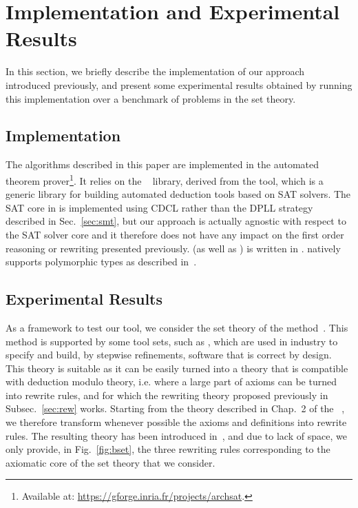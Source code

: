 
\section{Implementation and Experimental Results}
\label{sec:bench}

In this section, we briefly describe the implementation of our approach
introduced previously, and present some experimental results obtained by running
this implementation over a benchmark of problems in the \bmth{} set theory.

\subsection{Implementation}

The algorithms described in this paper are implemented in the \archsat{}
automated theorem prover\footnote{Available at:
\url{https://gforge.inria.fr/projects/archsat}.}. It relies on the
\msat{}~\cite{GB17} library, derived from the \altergoz{} tool, which is a
generic library for building automated deduction tools based on SAT solvers. The
SAT core in \msat{} is implemented using CDCL rather than the DPLL strategy
described in Sec.~\ref{sec:smt}, but our approach is actually agnostic with
respect to the SAT solver core and it therefore does not have any impact on the
first order reasoning or rewriting presented previously. \archsat{} (as well as
\msat{}) is written in \ocaml{}. \archsat{} natively supports polymorphic types
as described in~\cite{BP13}.

\subsection{Experimental Results}

As a framework to test our tool, we consider the set theory of the \bmth{}
method~\cite{B-Book}. This method is supported by some tool sets, such as
\atelierb{}, which are used in industry to specify and build, by stepwise
refinements, software that is correct by design. This theory is suitable as it
can be easily turned into a theory that is compatible with deduction modulo
theory, i.e. where a large part of axioms can be turned into rewrite rules, and
for which the rewriting theory proposed previously in Subsec.~\ref{sec:rew}
works. Starting from the theory described in Chap.~2 of the
\bbook{}~\cite{B-Book}, we therefore transform whenever possible the axioms and
definitions into rewrite rules. The resulting theory has been introduced
in~\cite{BA15}, and due to lack of space, we only provide, in
Fig.~\ref{fig:bset}, the three rewriting rules corresponding to the axiomatic
core of the \bmth{} set theory that we consider.

